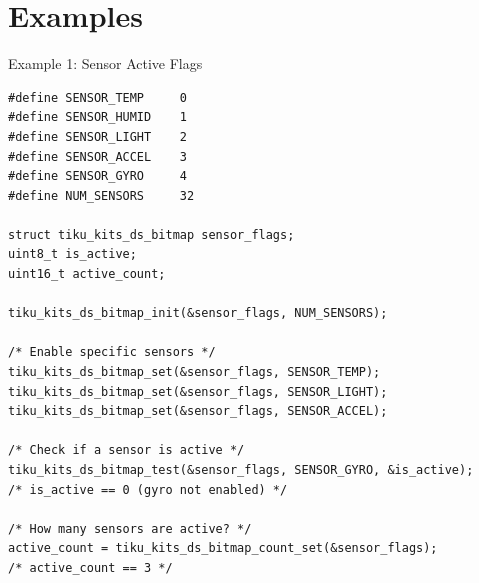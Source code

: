 \documentclass[aspectratio=169, 10pt]{beamer}
\begin{document}
\section{Examples}

\begin{frame}[fragile]{Example 1: Sensor Active Flags}
\begin{lstlisting}[style=cstyle,
  title={Track which sensors are active using a bitmap}]
#define SENSOR_TEMP     0
#define SENSOR_HUMID    1
#define SENSOR_LIGHT    2
#define SENSOR_ACCEL    3
#define SENSOR_GYRO     4
#define NUM_SENSORS     32

struct tiku_kits_ds_bitmap sensor_flags;
uint8_t is_active;
uint16_t active_count;

tiku_kits_ds_bitmap_init(&sensor_flags, NUM_SENSORS);

/* Enable specific sensors */
tiku_kits_ds_bitmap_set(&sensor_flags, SENSOR_TEMP);
tiku_kits_ds_bitmap_set(&sensor_flags, SENSOR_LIGHT);
tiku_kits_ds_bitmap_set(&sensor_flags, SENSOR_ACCEL);

/* Check if a sensor is active */
tiku_kits_ds_bitmap_test(&sensor_flags, SENSOR_GYRO, &is_active);
/* is_active == 0 (gyro not enabled) */

/* How many sensors are active? */
active_count = tiku_kits_ds_bitmap_count_set(&sensor_flags);
/* active_count == 3 */
\end{lstlisting}
\end{frame}
\end{document}
